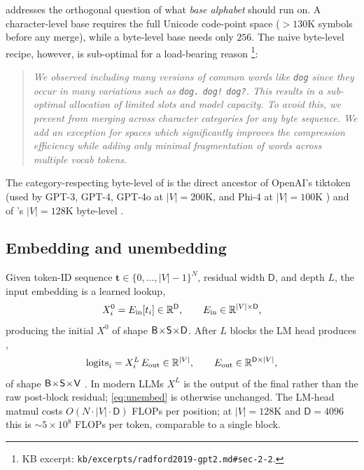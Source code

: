 \citet{radford2019-gpt2} addresses the orthogonal question of what
\emph{base alphabet}  should run on. A character-level base requires
the full Unicode code-point space ($> 130\text{K}$ symbols before any
merge), while a byte-level base needs only $256$. The naive
byte-level recipe, however, is sub-optimal for a load-bearing reason
\citep[\S 2.2]{radford2019-gpt2}\footnote{KB excerpt:
\texttt{kb/excerpts/radford2019-gpt2.md\#sec-2-2}.}:

\begin{quote}
\itshape We observed  including many versions of common words like
\texttt{dog} since they occur in many variations such as \texttt{dog.}
\texttt{dog!} \texttt{dog?}. This results in a sub-optimal allocation of
limited  slots and model capacity. To avoid this, we prevent
 from merging across character categories for any byte sequence. We
add an exception for spaces which significantly improves the compression
efficiency while adding only minimal fragmentation of words across
multiple vocab tokens.
\end{quote}

The category-respecting byte-level  of \citet{radford2019-gpt2} is
the direct ancestor of OpenAI's tiktoken (used by GPT-3, GPT-4, GPT-4o
at $|V|=200\text{K}$, and Phi-4 at $|V|=100\text{K}$
\citep[\S 2.1]{phi4}) and of 's $|V|=128\text{K}$ byte-level
 \citep[\S 2.1]{deepseek-v3}.

\subsection{Embedding and unembedding}
\label{sec:tok-embed-unembed}

Given token-ID sequence $\mathbf{t} \in \{0, \dots, |V|-1\}^N$, residual
width $\mathsf{D}$, and depth $L$, the input embedding is a learned
lookup,
\begin{equation}
X^0_i = E_{\text{in}}[t_i] \in \mathbb{R}^{\mathsf{D}}, \qquad
E_{\text{in}} \in \mathbb{R}^{|V| \times \mathsf{D}},
\label{eq:embed}
\end{equation}
producing the initial  $X^0$ of shape $\mathsf{B}\!\times\!\mathsf{S}\!\times\!\mathsf{D}$. After $L$
blocks the LM head produces ,
\begin{equation}
\mathrm{logits}_i = X^L_i \, E_{\text{out}} \in \mathbb{R}^{|V|}, \qquad
E_{\text{out}} \in \mathbb{R}^{\mathsf{D} \times |V|},
\label{eq:unembed}
\end{equation}
of shape $\mathsf{B}\!\times\!\mathsf{S}\!\times\!\mathsf{V}$ \citep[\S 3.4]{vaswani2017}. In modern 
LLMs $X^L$ is the output of the final  rather than the raw
post-block residual; \cref{eq:unembed} is otherwise unchanged. The
LM-head matmul costs $O(N \cdot |V| \cdot \mathsf{D})$ FLOPs per
position; at $|V| = 128\text{K}$ and $\mathsf{D} = 4096$ this is
$\sim\!5\times 10^{8}$ FLOPs per token, comparable to a single
 block.

